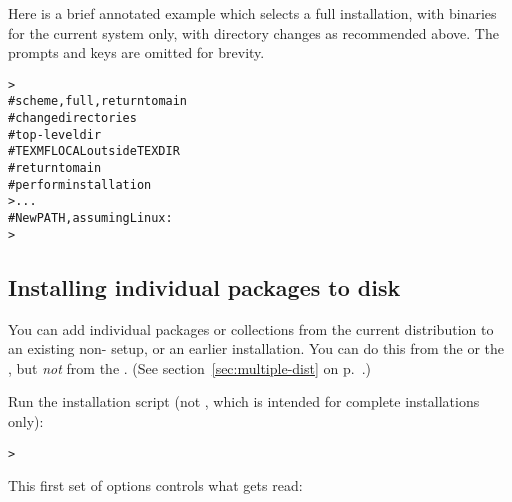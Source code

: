 \documentclass{article}
\begin{document}
\runtexconfig

Here is a brief annotated example which selects a full installation,
with binaries for the current system only, with directory changes as
recommended above.  The prompts and  keys are omitted for
brevity.

\begin{alltt}
> 
                       # scheme, full, return to main
                         # change directories
   # top-level dir
   # TEXMFLOCAL outside TEXDIR
                         # return to main
                         # perform installation
>  ...
# New PATH, assuming Linux:
> 
\end{alltt}

\ifindoubt


% 
\subsection{Installing individual packages to disk}

You can add individual packages or collections from the current
distribution to an existing non-\TeXLive{} setup, or an earlier
\TeXLive{} installation.  You can do this from the  \CD{}
or the  \DVD{}, but \emph{not} from the 
\CD.  (See section~\ref{sec:multiple-dist} on
p.~\pageref{sec:multiple-dist}.)

\startinst

Run the installation script  (not
, which is intended for complete installations
only):
\begin{alltt}
> 
\end{alltt}

This first set of options controls what gets read:
\end{document}
